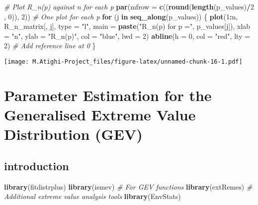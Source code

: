 \documentclass[
  12pt,
]{article}
\newenvironment{Shaded}{\begin{snugshade}}{\end{snugshade}}
\newcommand{\AttributeTok}[1]{\textcolor[rgb]{0.13,0.29,0.53}{#1}}
\newcommand{\CommentTok}[1]{\textcolor[rgb]{0.56,0.35,0.01}{\textit{#1}}}
\newcommand{\ControlFlowTok}[1]{\textcolor[rgb]{0.13,0.29,0.53}{\textbf{#1}}}
\newcommand{\DecValTok}[1]{\textcolor[rgb]{0.00,0.00,0.81}{#1}}
\newcommand{\FunctionTok}[1]{\textcolor[rgb]{0.13,0.29,0.53}{\textbf{#1}}}
\newcommand{\NormalTok}[1]{#1}
\newcommand{\SpecialCharTok}[1]{\textcolor[rgb]{0.81,0.36,0.00}{\textbf{#1}}}
\newcommand{\StringTok}[1]{\textcolor[rgb]{0.31,0.60,0.02}{#1}}
\begin{document}
\begin{Shaded}
\begin{Highlighting}[]
\CommentTok{\# Plot R\_n(p) against n for each p}
\FunctionTok{par}\NormalTok{(}\AttributeTok{mfrow =} \FunctionTok{c}\NormalTok{((}\FunctionTok{round}\NormalTok{(}\FunctionTok{length}\NormalTok{(p\_values)}\SpecialCharTok{/}\DecValTok{2}\NormalTok{ , }\DecValTok{0}\NormalTok{)), }\DecValTok{2}\NormalTok{))  }\CommentTok{\# One plot for each p}
\ControlFlowTok{for}\NormalTok{ (j }\ControlFlowTok{in} \FunctionTok{seq\_along}\NormalTok{(p\_values)) \{}
  \FunctionTok{plot}\NormalTok{(}\DecValTok{1}\SpecialCharTok{:}\NormalTok{n, R\_n\_matrix[, j], }\AttributeTok{type =} \StringTok{"l"}\NormalTok{, }
       \AttributeTok{main =} \FunctionTok{paste}\NormalTok{(}\StringTok{"R\_n(p) for p ="}\NormalTok{, p\_values[j]),}
       \AttributeTok{xlab =} \StringTok{"n"}\NormalTok{, }\AttributeTok{ylab =} \StringTok{"R\_n(p)"}\NormalTok{, }\AttributeTok{col =} \StringTok{"blue"}\NormalTok{, }\AttributeTok{lwd =} \DecValTok{2}\NormalTok{)}
  \FunctionTok{abline}\NormalTok{(}\AttributeTok{h =} \DecValTok{0}\NormalTok{, }\AttributeTok{col =} \StringTok{"red"}\NormalTok{, }\AttributeTok{lty =} \DecValTok{2}\NormalTok{) }\CommentTok{\# Add reference line at 0}
\NormalTok{\}}
\end{Highlighting}
\end{Shaded}

\texttt{[image: M.Atighi-Project\_files/figure-latex/unnamed-chunk-16-1.pdf]}

\section{Parameter Estimation for the Generalised Extreme Value
Distribution
(GEV)}\label{parameter-estimation-for-the-generalised-extreme-value-distribution-gev}

\subsection{introduction}\label{introduction-2}

\begin{Shaded}
\begin{Highlighting}[]
\FunctionTok{library}\NormalTok{(fitdistrplus)}
\FunctionTok{library}\NormalTok{(ismev)       }\CommentTok{\# For GEV functions}
\FunctionTok{library}\NormalTok{(extRemes)    }\CommentTok{\# Additional extreme value analysis tools}
\FunctionTok{library}\NormalTok{(EnvStats)}
\end{Highlighting}
\end{Shaded}
\end{document}
